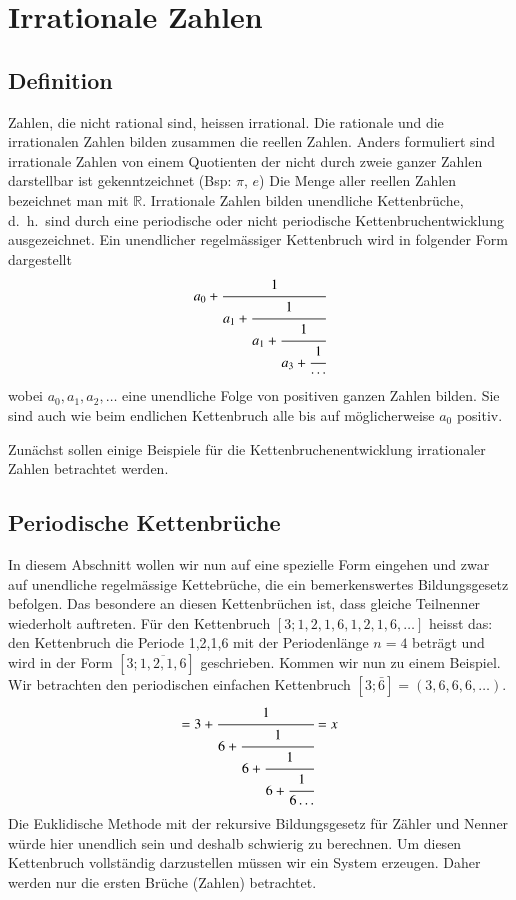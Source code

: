 %
%
%
\section{Irrationale Zahlen
\label{kettenbruch:section:Irrationale Zahlen}}
\subsection{Definition}
Zahlen, die nicht rational sind, heissen irrational. Die rationale
und die irrationalen Zahlen bilden zusammen die reellen Zahlen.
Anders formuliert sind irrationale Zahlen von einem Quotienten der
nicht durch zweie ganzer Zahlen darstellbar ist gekenntzeichnet
(Bsp:  $\pi$, $e$)
Die Menge aller reellen Zahlen bezeichnet man mit $\mathbb{R}$.
Irrationale Zahlen bilden unendliche Kettenbrüche, d.~h.~sind durch
eine periodische oder nicht periodische Kettenbruchentwicklung
ausgezeichnet.
Ein unendlicher regelmässiger Kettenbruch wird in folgender Form dargestellt
\begin{equation}
a_0 + \cfrac{1}{a_1+\cfrac{1}{a_1+\cfrac{1}{a_3+\cfrac{1}{\cdots}}}}
\end{equation}
wobei $a_0,a_1,a_2,\dots$ eine unendliche Folge von positiven
ganzen Zahlen bilden. Sie sind auch wie beim endlichen Kettenbruch
alle bis auf möglicherweise $a_0$ positiv.


Zunächst sollen einige Beispiele für die Kettenbruchenentwicklung
irrationaler Zahlen betrachtet werden.

\subsection{Periodische Kettenbrüche}
In diesem Abschnitt wollen wir nun auf eine spezielle Form eingehen
und zwar auf unendliche regelmässige Kettebrüche, die ein bemerkenswertes
Bildungsgesetz befolgen. Das besondere an diesen Kettenbrüchen ist,
dass gleiche Teilnenner wiederholt auftreten.
Für den Kettenbruch $[3;1,2,1,6,1,2,1,6,\dots]$ heisst das: den
Kettenbruch die Periode 1,2,1,6 mit der Periodenlänge $n=4$ beträgt
und wird in der Form $[3;\overline{1,2,1,6}]$ geschrieben.
Kommen wir nun zu einem Beispiel. Wir betrachten den periodischen
einfachen Kettenbruch $[3;\bar{6}] = (3,6,6,6,\dots)$.
\begin{equation}
[3;\bar{6}]
=
3 + \cfrac{1}{6+\cfrac{1}{6+\cfrac{1}{6+\cfrac{1}{6\dots}}}}
=
x
\end{equation}
Die Euklidische Methode mit der rekursive Bildungsgesetz für Zähler
und Nenner würde hier unendlich sein und deshalb schwierig zu
berechnen.
Um diesen Kettenbruch vollständig darzustellen müssen wir ein System
erzeugen. Daher werden nur die ersten Brüche (Zahlen) betrachtet.

